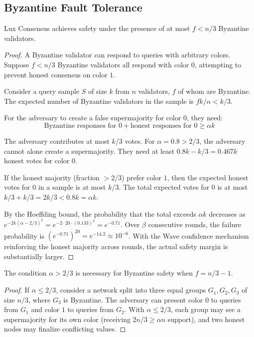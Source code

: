 \subsection{Byzantine Fault Tolerance}

\begin{theorem}
\label{thm:bft}
Lux Consensus achieves safety under the presence of at most $f < n/3$ Byzantine validators.
\end{theorem}

\begin{proof}
A Byzantine validator can respond to queries with arbitrary colors. Suppose $f < n/3$
Byzantine validators all respond with color $0$, attempting to prevent honest consensus
on color $1$.

Consider a query sample $S$ of size $k$ from $n$ validators, $f$ of whom are Byzantine.
The expected number of Byzantine validators in the sample is $fk/n < k/3$.

For the adversary to create a false supermajority for color $0$, they need:
\begin{equation}
\text{Byzantine responses for } 0 + \text{honest responses for } 0 \geq \alpha k
\end{equation}

The adversary contributes at most $k/3$ votes. For $\alpha = 0.8 > 2/3$, the adversary
cannot alone create a supermajority. They need at least $0.8k - k/3 = 0.467k$ honest
votes for color $0$.

If the honest majority (fraction $> 2/3$) prefer color $1$, then the expected honest
votes for $0$ in a sample is at most $k/3$. The total expected votes for $0$ is at most
$k/3 + k/3 = 2k/3 < 0.8k = \alpha k$.

By the Hoeffding bound, the probability that the total exceeds $\alpha k$ decreases
as $e^{-2k(\alpha - 2/3)^2} = e^{-2 \cdot 20 \cdot (0.133)^2} = e^{-0.71}$. Over $\beta$
consecutive rounds, the failure probability is $(e^{-0.71})^{20} = e^{-14.2} \approx 10^{-6}$.
With the Wave confidence mechanism reinforcing the honest majority across rounds, the
actual safety margin is substantially larger.
\end{proof}

\begin{lemma}
\label{lem:threshold}
The condition $\alpha > 2/3$ is necessary for Byzantine safety when $f = n/3 - 1$.
\end{lemma}

\begin{proof}
If $\alpha \leq 2/3$, consider a network split into three equal groups $G_1, G_2, G_3$
of size $n/3$, where $G_3$ is Byzantine. The adversary can present color $0$ to queries
from $G_1$ and color $1$ to queries from $G_2$. With $\alpha \leq 2/3$, each group may
see a supermajority for its own color (receiving $2n/3 \geq \alpha n$ support), and two
honest nodes may finalize conflicting values.
\end{proof}

